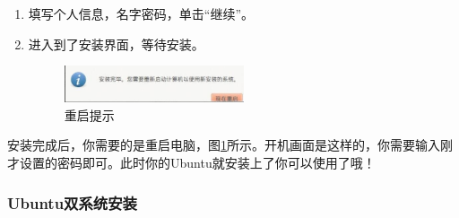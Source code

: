 \documentclass{article}
\begin{document}
\begin{enumerate}
\item  填写个人信息，名字密码，单击“继续”。

\item  进入到了安装界面，等待安装。

\begin{figure}[!htb] %
\centering
\includegraphics[width=0.5\textwidth]{tu14.jpeg}
\caption{\small 重启提示}
\label{tu14}
\end{figure} 
\end{enumerate}
安装完成后，你需要的是重启电脑，图\ref{tu14}所示。开机画面是这样的，你需要输入刚才设置的密码即可。此时你的Ubuntu就安装上了你可以使用了哦！

\subsubsection{Ubuntu双系统安装}
\end{document}
